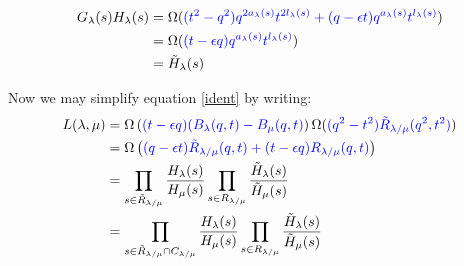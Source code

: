 \documentclass[12pt,dvips]{amsart}
\begin{document}
\begin{align*}
G_\lambda(s) H_\lambda(s) &= \Omega({\color{blue}(t^2-q^2) q^{2a_\lambda(s)} t^{2l_\lambda(s)} + (q-\epsilon t) q^{a_\lambda(s)} t^{l_\lambda(s)}}) \\
&= \Omega({\color{blue}(t-\epsilon q) q^{a_\lambda(s)} t^{l_\lambda(s)}}) \\
&= \tilde{H}_\lambda(s)
\end{align*}

\bigskip\bigskip
\noindent
Now we may simplify equation \eqref{ident} by writing:
\begin{align*}
L(\lambda, \mu) &= \Omega \left ( {\color{blue}(t - \epsilon q) (B_\lambda(q,t) - B_\mu(q,t)} \right ) \Omega({\color{blue}(q^2 - t^2) \tilde{R}_{\lambda / \mu}(q^2,t^2)})  \\
&= \Omega \left ( {\color{blue}(q-\epsilon t)\tilde{R}_{\lambda / \mu}(q,t)  + (t - \epsilon q)R_{\lambda / \mu}(q,t)} \right )  \\
&=  \prod_{s \in \tilde{R}_{\lambda / \mu}} \frac{H_\lambda(s)}{H_\mu(s)} \prod_{s \in R_{\lambda / \mu}} \frac{\tilde{H}_\lambda(s)}{\tilde{H}_\mu(s)} \\
&=  \prod_{s \in \tilde{R}_{\lambda / \mu} \cap C_{\lambda / \mu}} \frac{H_\lambda(s)}{H_\mu(s)} \prod_{s \in R_{\lambda / \mu}} \frac{\tilde{H}_\lambda(s)}{\tilde{H}_\mu(s)} 
\end{align*}
\end{document}
